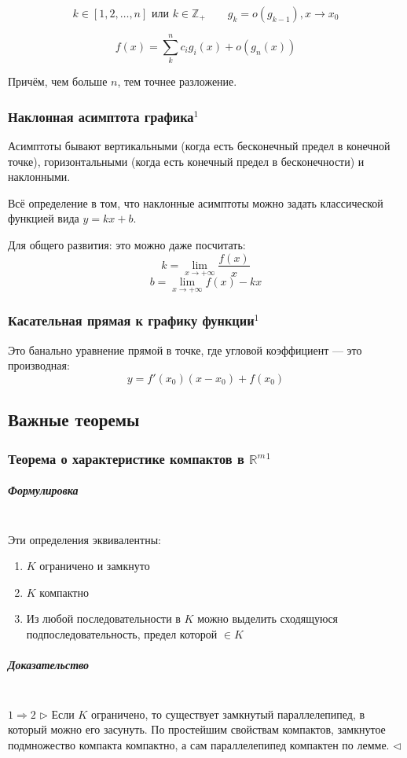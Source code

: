 \documentclass{article}
\let\vanillasubparagraph\subparagraph
\renewcommand{\subparagraph}[1]{\vanillasubparagraph{#1}\mbox{}\\}
\begin{document}
\[k \in [1, 2, \ldots, n] \text{ или } k \in \mathbb{Z}_+ \qquad g_k = o(g_{k - 1}), x \rightarrow x_0\]

\[f(x) = \sum_k^n{c_ig_i(x) + o(g_n(x))}\]

Причём, чем больше $n$, тем точнее разложение.

\subsubsection{Наклонная асимптота графика\texorpdfstring{$^1$}{}}
Асимптоты бывают вертикальными (когда есть бесконечный предел в конечной точке), горизонтальными (когда есть конечный предел в бесконечности) и наклонными.

Всё определение в том, что наклонные асимптоты можно задать классической функцией вида $y = kx + b$. 

Для общего развития: это можно даже посчитать: 
$$
k = \lim_{x\rightarrow +\infty} \frac{f(x)}{x}
$$
$$
b = \lim_{x\rightarrow +\infty} f(x) - kx
$$

\subsubsection{Касательная прямая к графику функции\texorpdfstring{$^1$}{}}
Это банально уравнение прямой в точке, где угловой коэффициент --- это производная:
$$
y = f'(x_0)(x - x_0) + f(x_0)
$$


\newpage
\subsection{Важные теоремы}
\subsubsection{Теорема о характеристике компактов в \texorpdfstring{$\mathbb{R}^m$}{m-мерном R}\texorpdfstring{$^1$}{}}
\label{КомпХарR}
\subparagraph{Формулировка}
Эти определения эквивалентны:
\begin{enumerate}
    \item $K$ ограничено и замкнуто
    \item $K$ компактно
    \item Из любой последовательности в $K$ можно выделить сходящуюся подпоследовательность, предел которой $\in K$
\end{enumerate}

\subparagraph{Доказательство}
$1 \Rightarrow 2$
$\rhd$
Если $K$ ограничено, то существует замкнутый параллелепипед, в который можно его засунуть. По простейшим свойствам компактов, замкнутое подмножество компакта компактно, а сам параллелепипед компактен по лемме.
$\lhd$
\end{document}
